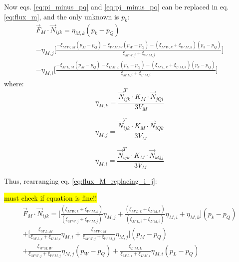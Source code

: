 \documentclass{article}
\begin{document}
Now eqs. \ref{eq:pi_minus_pq} and \ref{eq:pj_minus_pq} can be replaced in eq. \ref{eq:flux_m}, and the only unknown is $ p_{k} $:
\begin{equation} \label{eq:flux_M_replacing_i_j}
\begin{split}
\vec{F}_{M} \cdot \vec{N}_{ijk} = \eta_{M,k}(p_{k} - p_{Q}) \\
 - \eta_{M,j} \Bigg[ \frac{- \xi_{M'W,M}(p_{M} - p_{Q}) - \xi_{W'M,W}(p_{W} - p_{Q}) - (\xi_{M'W,k} + \xi_{W'M,k})(p_{k} - p_{Q})}{\xi_{M'W,j} + \xi_{W'M,j}} \Bigg] \\
 - \eta_{M,i} \Bigg[ \frac{- \xi_{M'L,M}(p_{M} - p_{Q})- \xi_{L'M,L}(p_{L} - p_{Q})- (\xi_{M'L,k} + \xi_{L'M,k})(p_{k} - p_{Q})}{\xi_{M'L,i} + \xi_{L'M,i}} \Bigg]
\end{split}
\end{equation}
where:
\begin{displaymath}
	\eta_{M,k} = \frac{\vec{N}^{T}_{ijk} \cdot K_{M} \cdot \vec{N}_{jQi}}{3V_{M}}
\end{displaymath}

\begin{displaymath}
	\eta_{M,j} = \frac{\vec{N}^{T}_{ijk} \cdot K_{M} \cdot \vec{N}_{iQk}}{3V_{M}}
\end{displaymath}

\begin{displaymath}
	\eta_{M,i} = \frac{\vec{N}^{T}_{ijk} \cdot K_{M} \cdot \vec{N}_{kQj}}{3V_{M}}
\end{displaymath}

Thus, rearranging eq. \ref{eq:flux_M_replacing_i_j}:

\hl{must check if equation is fine!!}
\begin{equation} \label{eq:flux_M_replacing_i_j}
\begin{split}
\vec{F}_{M} \cdot \vec{N}_{ijk} = \Bigg[ \frac{(\xi_{M'W,k} + \xi_{W'M,k})}{(\xi_{M'W,j} + \xi_{W'M,j})}\eta_{M,j} + \frac{(\xi_{M'L,k} + \xi_{L'M,k})}{(\xi_{M'L,i} + \xi_{L'M,i})}\eta_{M,i} + \eta_{M,k} \Bigg](p_{k} - p_{Q}) \\
+ \Bigg[\frac{\xi_{M'L,M}}{\xi_{M'L,i} + \xi_{L'M,i}}\eta_{M,i} + \frac{\xi_{M'W,M}}{\xi_{M'W,j} + \xi_{W'M,j}}\eta_{M,j} \Bigg](p_{M} - p_{Q}) \\
+ \frac{\xi_{W'M,W}}{\xi_{M'W,j} + \xi_{W'M,j}}\eta_{M,j}(p_{W} - p_{Q}) 
+\frac{\xi_{L'M,L}}{\xi_{M'L,i} + \xi_{L'M,i}}\eta_{M,i}(p_{L} - p_{Q})
\end{split}
\end{equation}
\end{document}
